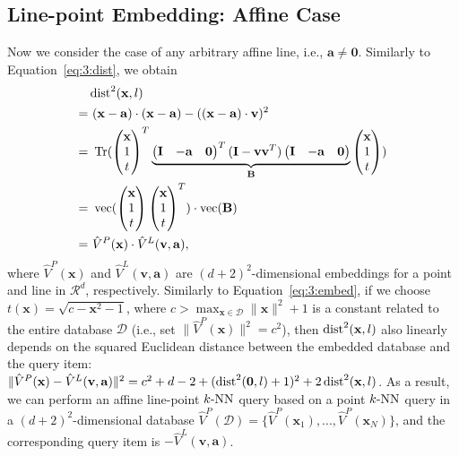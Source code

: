 \subsection{Line-point Embedding: Affine Case}
Now we consider the case of any arbitrary affine line, i.e., $\mathbf a \neq \mathbf 0$. Similarly to Equation~\ref{eq:3:dist}, we obtain
\begin{align}
  \label{eq:3:dist2}
   & \operatorname{dist}^2(\mathbf x, l) \notag \\
  =& \ (\mathbf x - \mathbf a) \cdot (\mathbf x - \mathbf a) - ((\mathbf x - \mathbf a) \cdot \mathbf v)^2 \notag  \\
  =& \ \operatorname{Tr}(\begin{pmatrix} \mathbf x \\ 1 \\ t \end{pmatrix} ^T \underbrace{\begin{pmatrix} \mathbf I & - \mathbf a & \mathbf 0 \end{pmatrix}^T (\mathbf I - \mathbf v \mathbf v^T) \begin{pmatrix} \mathbf I & -\mathbf a & \mathbf 0 \end{pmatrix}}_{\mathbf B} \begin{pmatrix} \mathbf x \\ 1 \\ t \end{pmatrix}) \notag \\
  =& \ \operatorname{vec}(\begin{pmatrix} \mathbf x \\ 1 \\ t \end{pmatrix} \begin{pmatrix} \mathbf x \\ 1 \\ t \end{pmatrix}^T) \cdot \operatorname{vec}(\mathbf B) \\
  =& \ \hat{V}^P(\mathbf x) \cdot \hat{V}^L(\mathbf v, \mathbf a), \notag
\end{align}
where $\hat{V}^P(\mathbf x)$ and $\hat{V}^L(\mathbf v, \mathbf a)$ are $(d+2)^2$-dimensional embeddings for a point and line in $\mathcal R^d$, respectively. Similarly to Equation~\ref{eq:3:embed}, if we choose $t(\mathbf x) = \sqrt{c - \mathbf x^2 - 1}$, where $c > \max_{\mathbf x \in \mathcal D} \|\mathbf x\|^2 + 1$ is a constant related to the entire database $\mathcal D$ (i.e., set $\|\hat{V}^P(\mathbf x)\|^2 = c^2$), then $\operatorname{dist}^2(\mathbf x, l)$ also linearly depends on the squared Euclidean distance between the embedded database and the query item: $\|\hat{V}^P(\mathbf x) - \hat{V}^L(\mathbf v, \mathbf a)\|^2 = c^2 + d - 2 + (\operatorname{dist}^2(\mathbf 0, l) + 1)^2 + 2 \operatorname{dist}^2(\mathbf x, l)$. As a result, we can perform an affine line-point $k\text{-NN}$ query based on a point $k\text{-NN}$ query in a $(d+2)^2$-dimensional database $\hat{V}^P(\mathcal D) = \{\hat{V}^P(\mathbf x_1), ..., \hat{V}^P(\mathbf x_N) \}$, and the corresponding query item is $-\hat{V}^L(\mathbf v, \mathbf a)$.

